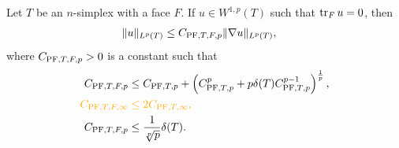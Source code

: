 \documentclass[10pt,letterpaper]{article}
\newcommand\cye[1]{%
  \protect\leavevmode
  \begingroup
    \color{red!35!yellow}%
    #1%
  \endgroup
}
\begin{document}
\begin{lemma}\label{lemma:mixedbconsimplex}
    Let $T$ be an $n$-simplex with a face $F$. 
    If $u \in W^{1,p}(T)$ such that $\operatorname{tr}_{F} u = 0$, then 
    \begin{align*}
        \| u \|_{L^{p}(T)}
        &
        \leq 
        C_{{\rm PF},T,F,p} \| \nabla u \|_{L^{p}(T)}
        ,
    \end{align*}
    where $C_{{\rm PF},T,F,p} > 0$ is a constant such that 
    \begin{align*}
        C_{\PF,T,F,p}
        &\leq 
        C_{\PF,T,p} + \left( C_{\PF,T,p}^{p} + p \diam(T) C_{\PF,T,p}^{p-1} \right)^{\frac 1 p},  
        \\
        \cye{C_{\PF,T,F,\infty}}
        &\cye{\leq 
        2 C_{\PF,T,\infty},  }
        \\
        C_{\PF,T,F,p}
        &\leq
        \frac{1}{\sqrt[p]{p}}
        \diam(T)
        .
    \end{align*}
\end{lemma}
\end{document}
